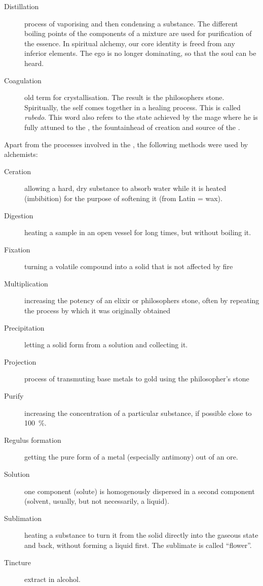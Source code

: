 \documentclass[notitlepage,british]{scrartcl}
\begin{document}
\begin{refsection}
\begin{description}
  \item[Distillation]{process of vaporising and then condensing a substance. The different boiling points of the components of a mixture are used for purification of the essence. In spiritual alchemy, our core identity is freed from any inferior elements. The ego is no longer dominating, so that the soul can be heard. }
  \item[Coagulation]{old term for crystallisation. The result is the philosophers stone. Spiritually, the self comes together in a healing process. This is called \emph{rubedo}. This word also refers to the state achieved by the mage where he is fully attuned to the , the fountainhead of creation and source of the . }
\end{description}

Apart from the processes involved in the , the following methods were used by alchemists:
\begin{description}
  \item[Ceration]{allowing a hard, dry substance to absorb water while it is heated (imbibition) for the purpose of softening it (from Latin  = wax). }
  \item[Digestion]{heating a sample in an open vessel for long times, but without boiling it.}
  \item[Fixation]{turning a volatile compound into a solid that is not affected by fire}
  \item[Multiplication]{increasing the potency of an elixir or philosophers stone, often by repeating the process by which it was originally obtained}
  \item[Precipitation]{letting a solid form from a solution and collecting it. }
  \item[Projection]{process of transmuting base metals to gold using the philosopher's stone}
  \item[Purify]{increasing the concentration of a particular substance, if possible close to \SI{100}{\%}. }
  \item[Regulus formation]{getting the pure form of a metal (especially antimony) out of an ore. }
  \item[Solution]{one component (solute) is homogenously dispersed in a second component (solvent, usually, but not necessarily, a liquid). }
  \item[Sublimation]{heating a substance to turn it from the solid directly into the gaseous state and back, without forming a liquid first. The sublimate is called ``flower''.}
  \item[Tincture]{extract in alcohol.}
\end{description}


\end{refsection}
\end{document}
